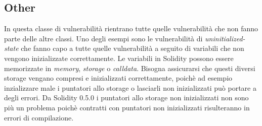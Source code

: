 \documentclass[../../Thesis.tex]{subfiles}
\begin{document}
\subsection{Other}
In questa classe di vulnerabilità rientrano tutte quelle vulnerabilità che non fanno parte delle altre classi. Uno degli esempi sono le vulnerabilità di \emph{uninitialized-state} che fanno capo a tutte quelle vulnerabilità a seguito di variabili che non vengono inizializzate correttamente. Le variabili in Solidity possono essere memorizzate in \emph{memory}, \emph{storage} o \emph{calldata}. Bisogna assicurarsi che questi diversi storage vengano compresi e inizializzati correttamente, poichè ad esempio inzializzare male i puntatori allo storage o lasciarli non inizializzati può portare a degli errori. Da Solidity 0.5.0 i puntatori allo storage non inizializzati non sono più un problema poichè contratti con puntatori non inizializzati risulteranno in errori di compilazione.  
\end{document}

